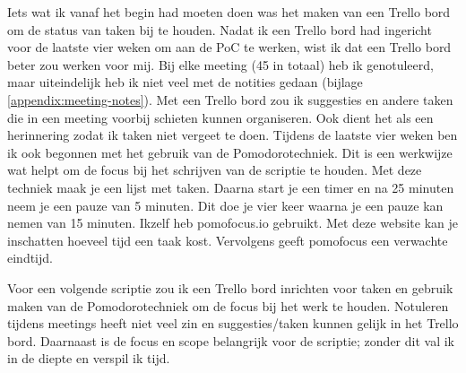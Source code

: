 Iets wat ik vanaf het begin had moeten doen was het maken van een Trello bord om de status van taken bij te houden. Nadat ik een Trello bord had ingericht voor de laatste vier weken om aan de PoC te werken, wist ik dat een Trello bord beter zou werken voor mij. Bij elke meeting (45 in totaal) heb ik genotuleerd, maar uiteindelijk heb ik niet veel met de notities gedaan (bijlage \ref{appendix:meeting-notes}). Met een Trello bord zou ik suggesties en andere taken die in een meeting voorbij schieten kunnen organiseren. Ook dient het als een herinnering zodat ik taken niet vergeet te doen. Tijdens de laatste vier weken ben ik ook begonnen met het gebruik van de Pomodorotechniek. Dit is een werkwijze wat helpt om de focus bij het schrijven  van de scriptie te houden. Met deze techniek maak je een lijst met taken. Daarna start je een timer en na 25 minuten neem je een pauze van 5 minuten. Dit doe je vier keer waarna je een pauze kan nemen van 15 minuten. Ikzelf heb pomofocus.io gebruikt. Met deze website kan je inschatten hoeveel tijd een taak kost. Vervolgens geeft pomofocus een verwachte eindtijd.

Voor een volgende scriptie zou ik een Trello bord inrichten voor taken en gebruik maken van de Pomodorotechniek om de focus bij het werk te houden. Notuleren tijdens meetings heeft niet veel zin en suggesties/taken kunnen gelijk in het Trello bord. Daarnaast is de focus en scope belangrijk voor de scriptie; zonder dit val ik in de diepte en verspil ik tijd.






